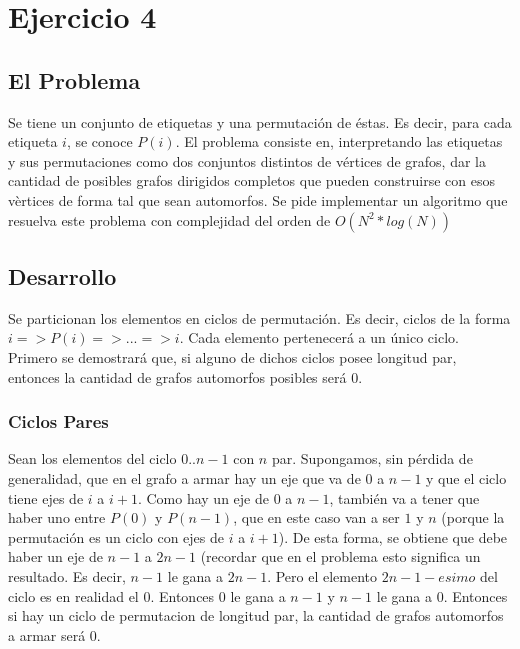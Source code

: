 \section{Ejercicio 4}
\subsection{El Problema}

Se tiene un conjunto de etiquetas y una permutación de éstas. Es decir, para cada etiqueta $i$, se conoce $P(i)$. El problema consiste en, interpretando las etiquetas y sus permutaciones como dos conjuntos distintos de vértices de grafos, dar la cantidad de posibles grafos dirigidos completos que pueden construirse con esos vèrtices de forma tal que sean automorfos. Se pide implementar un algoritmo que resuelva este problema con complejidad del orden de $O(N^2*log(N))$

\subsection{Desarrollo}

Se particionan los elementos en ciclos de permutación. Es decir, ciclos de la forma $i => P(i) =>... => i$. Cada elemento pertenecerá a un único ciclo. Primero se demostrará que, si alguno de dichos ciclos posee longitud par, entonces la cantidad de grafos automorfos posibles será 0.


\subsubsection{Ciclos Pares}

Sean los elementos del ciclo $0..n-1$ con $n$ par. Supongamos, sin pérdida de generalidad, que en el grafo a armar hay un eje que va de $0$ a $n-1$ y que el ciclo tiene ejes de $i$ a $i+1$. Como hay un eje de $0$ a $n-1$, también va a tener que haber uno entre $P(0)$ y $P(n-1)$, que en este caso van a ser $1$ y $n$ (porque la permutación es un ciclo con ejes de $i$ a $i+1$). De esta forma, se obtiene que debe haber un eje de $n-1$ a $2n-1$ (recordar que en el problema esto significa un resultado. Es decir, $n-1$ le gana a $2n-1$. Pero el elemento $2n-1-esimo$ del ciclo es en realidad el $0$. Entonces $0$ le gana a $n-1$ y $n-1$ le gana a $0$. Entonces si hay un ciclo de permutacion de longitud par, la cantidad de grafos automorfos a armar será 0.


